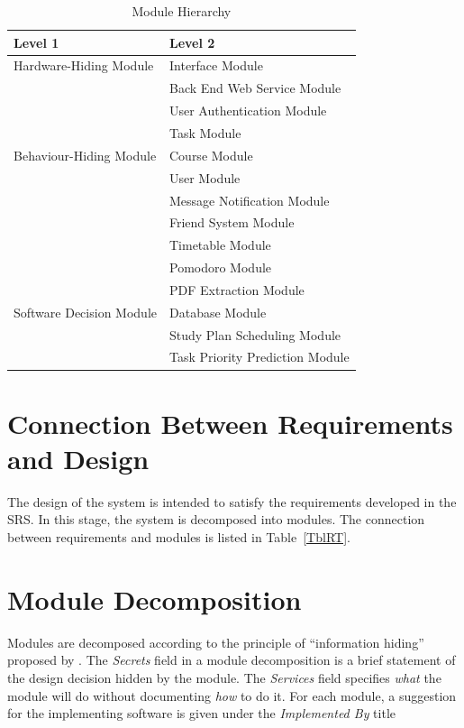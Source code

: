 \documentclass[12pt, titlepage]{article}
\begin{document}
\begin{table}[h!]
\centering
\begin{tabular}{p{} p{}}
\toprule
\textbf{Level 1} & \textbf{Level 2}\\
\midrule

{Hardware-Hiding Module} & Interface Module\\
\midrule

\multirow{7}{0.3\textwidth}{Behaviour-Hiding Module}
& Back End Web Service Module\\
& User Authentication Module\\ 
& Task Module\\
& Course Module\\
& User Module\\
& Message Notification Module\\ 
& Friend System Module\\ 
& Timetable Module\\ 
& Pomodoro Module\\
\midrule

\multirow{3}{0.3\textwidth}{Software Decision Module}
& PDF Extraction Module \\
& Database Module\\
& Study Plan Scheduling Module \\
& Task Priority Prediction Module \\

\bottomrule

\end{tabular}
\caption{Module Hierarchy}
\label{TblMH}
\end{table}

\newpage
\section{Connection Between Requirements and Design} \label{SecConnection}

The design of the system is intended to satisfy the requirements developed in
the SRS. In this stage, the system is decomposed into modules. The connection
between requirements and modules is listed in Table~\ref{TblRT}.

\section{Module Decomposition} \label{SecMD}

Modules are decomposed according to the principle of ``information hiding''
proposed by \citet{ParnasEtAl1984}. The \emph{Secrets} field in a module
decomposition is a brief statement of the design decision hidden by the
module. The \emph{Services} field specifies \emph{what} the module will do
without documenting \emph{how} to do it. For each module, a suggestion for the
implementing software is given under the \emph{Implemented By} title
\end{document}
